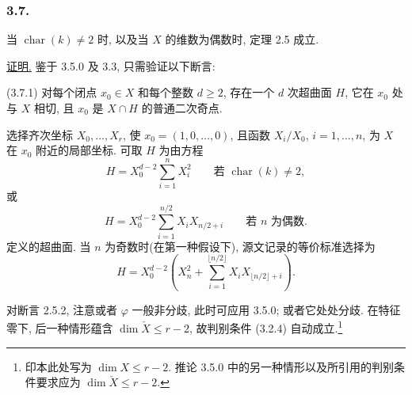 \subsubsection*{3.7.}
当 $\operatorname{char}(k)\ne2$ 时, 以及当 $X$ 的维数为偶数时, 定理 2.5 成立.

\noindent\underline{证明.}
鉴于 3.5.0 及 3.3, 只需验证以下断言:

\medskip
\noindent(3.7.1) 对每个闭点 $x_0\in X$ 和每个整数 $d\geq2$, 存在一个 $d$ 次超曲面 $H$, 它在 $x_0$ 处与 $X$ 相切, 且 $x_0$ 是 $X\cap H$ 的普通二次奇点.

选择齐次坐标 $X_0,\ldots,X_r$, 使 $x_0=(1,0,\ldots,0)$, 且函数 $X_i/X_0$, $i=1,\ldots,n$, 为 $X$ 在 $x_0$ 附近的局部坐标. 可取 $H$ 为由方程
\begin{equation}\tag{3.7.1.1}
H=X_0^{d-2}\sum_{i=1}^{n}X_i^2
\qquad\text{若 }\operatorname{char}(k)\ne2,
\end{equation}
或
\begin{equation}\tag{3.7.1.2}
H=X_0^{d-2}\sum_{i=1}^{n/2}X_iX_{n/2+i}
\qquad\text{若 }n\text{ 为偶数}.
\end{equation}
定义的超曲面. 当 $n$ 为奇数时(在第一种假设下), 源文记录的等价标准选择为
\begin{equation}\tag{3.7.1.3}
H=X_0^{d-2}
\left(X_n^2+
\sum_{i=1}^{\lfloor n/2\rfloor}
X_iX_{\lfloor n/2\rfloor+i}\right).
\end{equation}

对断言 2.5.2, 注意或者 $\varphi$ 一般非分歧, 此时可应用 3.5.0; 或者它处处分歧. 在特征零下, 后一种情形蕴含 $\dim\check X\leq r-2$, 故判别条件 (3.2.4) 自动成立.\footnote{印本此处写为 $\dim X\leq r-2$. 推论 3.5.0 中的另一种情形以及所引用的判别条件要求应为 $\dim\check X\leq r-2$.}